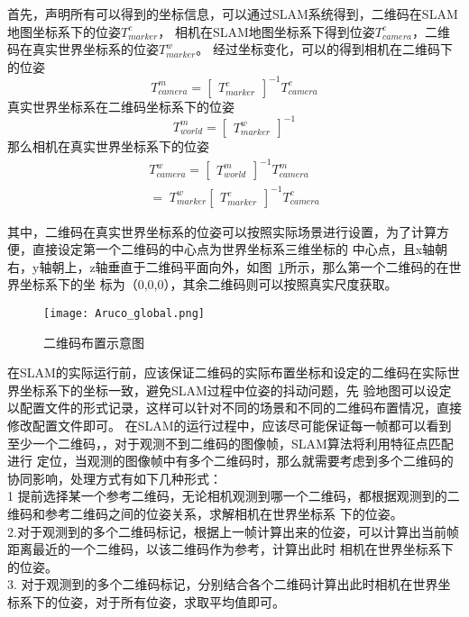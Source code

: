 首先，声明所有可以得到的坐标信息，可以通过SLAM系统得到，二维码在SLAM地图坐标系下的位姿$T_{marker}^{c}$，
相机在SLAM地图坐标系下得到位姿$T_{camera}^{c}$，二维码在真实世界坐标系的位姿$T_{marker}^{w}$。
经过坐标变化，可以的得到相机在二维码下的位姿
\begin{equation}
T_{camera}^{m} =\begin{bmatrix}T_{marker}^{c}\end{bmatrix}^{-1}T_{camera}^{c}
\end{equation}
真实世界坐标系在二维码坐标系下的位姿
\begin{equation}
T_{world}^{m} =\begin{bmatrix}T_{marker}^{w}\end{bmatrix}^{-1}
\end{equation}
那么相机在真实世界坐标系下的位姿
\begin{equation}
\begin{array}{l}T_{camera}^w=
\begin{bmatrix}T_{world}^m\end{bmatrix}^{-1}T_{camera}^m\\=\;T_{marker}^w
\begin{bmatrix}T_{marker}^c\end{bmatrix}^{-1}T_{camera}^c\end{array}
\end{equation}

其中，二维码在真实世界坐标系的位姿可以按照实际场景进行设置，为了计算方便，直接设定第一个二维码的中心点为世界坐标系三维坐标的
中心点，且x轴朝右，y轴朝上，z轴垂直于二维码平面向外，如图~\ref{fig:Aruco_global}所示，那么第一个二维码的在世界坐标系下的坐
标为（0,0,0），其余二维码则可以按照真实尺度获取。
\begin{figure}[H] %
  \centering
  \texttt{[image: Aruco\_global.png]}
  \caption{二维码布置示意图}
  \label{fig:Aruco_global}
\end{figure}
在SLAM的实际运行前，应该保证二维码的实际布置坐标和设定的二维码在实际世界坐标系下的坐标一致，避免SLAM过程中位姿的抖动问题，先
验地图可以设定以配置文件的形式记录，这样可以针对不同的场景和不同的二维码布置情况，直接修改配置文件即可。
在SLAM的运行过程中，应该尽可能保证每一帧都可以看到至少一个二维码，，对于观测不到二维码的图像帧，SLAM算法将利用特征点匹配进行
定位，当观测的图像帧中有多个二维码时，那么就需要考虑到多个二维码的协同影响，处理方式有如下几种形式：\\
1 提前选择某一个参考二维码，无论相机观测到哪一个二维码，都根据观测到的二维码和参考二维码之间的位姿关系，求解相机在世界坐标系
下的位姿。\\
2.对于观测到的多个二维码标记，根据上一帧计算出来的位姿，可以计算出当前帧距离最近的一个二维码，以该二维码作为参考，计算出此时
相机在世界坐标系下的位姿。\\
3. 对于观测到的多个二维码标记，分别结合各个二维码计算出此时相机在世界坐标系下的位姿，对于所有位姿，求取平均值即可。

